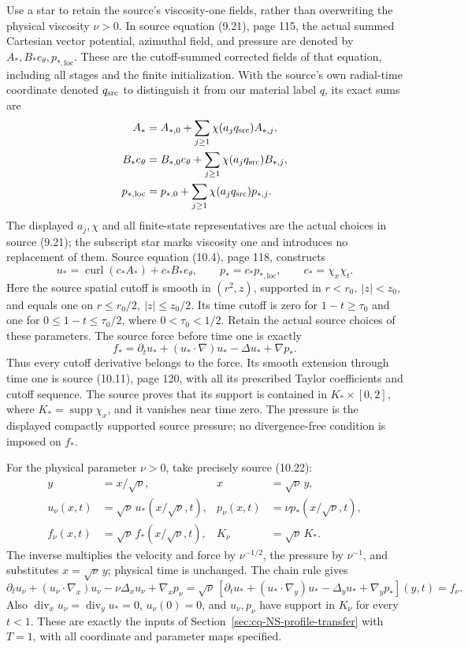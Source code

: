Use a star to retain the source's viscosity-one fields, rather than
overwriting the physical viscosity $\nu>0$. In source equation (9.21),
page 115, the actual summed Cartesian vector potential, azimuthal field,
and pressure are denoted by $A_*,B_*e_\theta,p_{*,\mathrm{loc}}$.
These are the cutoff-summed corrected fields of that equation, including
all stages and the finite initialization.
With the source's own radial-time coordinate denoted $q_{\rm src}$
to distinguish it from our material label $q$, its exact sums are
\[
\begin{aligned}
 A_*&=A_{*,0}+\sum_{j\geq1}\chi(a_jq_{\rm src})A_{*,j},\\
 B_*e_\theta&=B_{*,0}e_\theta+
                        \sum_{j\geq1}\chi(a_jq_{\rm src})B_{*,j},\\
 p_{*,\mathrm{loc}}&=p_{*,0}+
                        \sum_{j\geq1}\chi(a_jq_{\rm src})p_{*,j}.
\end{aligned}
\]
The displayed $a_j,\chi$ and all finite-state representatives
are the actual choices in source (9.21); the subscript star
marks viscosity one and introduces no replacement of them.
 Source equation (10.4), page
118, constructs
\[
 u_* = \operatorname{curl}(c_*A_*)+c_*B_*e_\theta,
 \qquad p_*=c_*p_{*,\mathrm{loc}},\qquad c_*=\chi_x\chi_t.
\]
Here the source spatial cutoff is smooth in $(r^2,z)$, supported in
$r<r_0,\ |z|<z_0$, and equals one on
$r\leq r_0/2,\ |z|\leq z_0/2$. Its time cutoff is zero for
$1-t\geq\tau_0$ and one for $0\leq1-t\leq\tau_0/2$, where
$0<\tau_0<1/2$. Retain the actual source choices of these parameters.
The source force before time one is exactly
\[
 f_* = \partial_tu_*+(u_*\cdot\nabla)u_*
                     -\Delta u_*+\nabla p_*.
\]
Thus every cutoff derivative belongs to the force. Its smooth extension
through time one is source (10.11), page 120, with all its prescribed
Taylor coefficients and cutoff sequence. The source proves that its
support is contained in $K_*\times[0,2]$, where
$K_*=\operatorname{supp}\chi_x$, and it vanishes near time zero.
The pressure is the displayed compactly supported source pressure;
no divergence-free condition is imposed on $f_*$.

For the physical parameter $\nu>0$, take precisely source (10.22):
\begin{align*}
 y&=x/\sqrt\nu, & x&=\sqrt\nu\,y,\\
 u_\nu(x,t)&=\sqrt\nu\,u_*(x/\sqrt\nu,t),&
 p_\nu(x,t)&=\nu p_*(x/\sqrt\nu,t),\\
 f_\nu(x,t)&=\sqrt\nu\,f_*(x/\sqrt\nu,t),&
 K_\nu&=\sqrt\nu\,K_*.
\end{align*}
The inverse multiplies the velocity and force by $\nu^{-1/2}$,
the pressure by $\nu^{-1}$, and substitutes $x=\sqrt\nu\,y$;
physical time is unchanged. The chain rule gives
\[
 \partial_tu_\nu+(u_\nu\cdot\nabla_x)u_\nu
       -\nu\Delta_xu_\nu+\nabla_xp_\nu
 =\sqrt\nu\,[\partial_tu_*+(u_*\cdot\nabla_y)u_*
                    -\Delta_yu_*+\nabla_yp_*](y,t)=f_\nu.
\]
Also $\operatorname{div}_xu_\nu=\operatorname{div}_yu_*=0$,
$u_\nu(0)=0$, and $u_\nu,p_\nu$ have support in $K_\nu$ for every
$t<1$. These are exactly the inputs of Section~\ref{sec:cq-NS-profile-transfer} with
$T=1$, with all coordinate and parameter maps specified.

